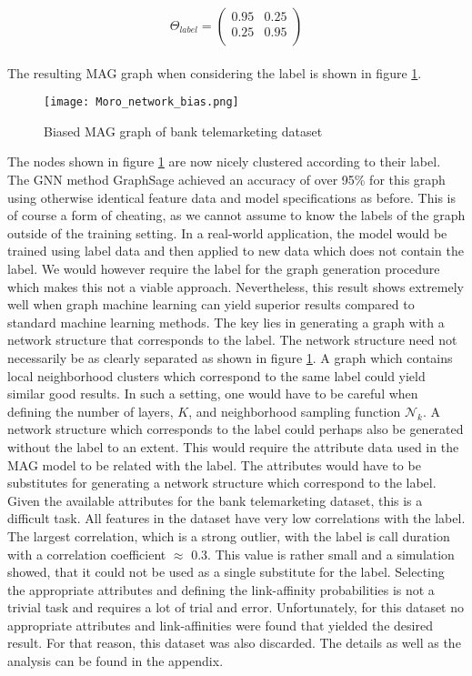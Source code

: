   \[ \Theta_{label} = 
	\begin{pmatrix}
        0.95 & 0.25 \\
		0.25 & 0.95 \\
	\end{pmatrix}
	\] \\
  
  \noindent The resulting MAG graph when considering the label is shown in figure
  \ref{fig:Moro_bias}.

  \begin{figure}[h]
		\centering
		\texttt{[image: Moro\_network\_bias.png]}
		\caption{Biased MAG graph of bank telemarketing dataset}
        \label{fig:Moro_bias}
  \end{figure}

  \noindent The nodes shown in figure \ref{fig:Moro_bias} are now nicely
  clustered according to their label. The GNN method GraphSage achieved an 
  accuracy of over 95\% for this graph using otherwise identical feature data
  and model specifications as before. This is of course a form of cheating, as 
  we cannot assume to know the labels of the graph outside of the training 
  setting. In a real-world application, the model would be trained using label
  data and then applied to new data which does not contain the label. We would
  however require the label for the graph generation procedure which makes this
  not a viable approach. Nevertheless, this result shows extremely well when
  graph machine learning can yield superior results compared to standard
  machine learning methods. The key lies in generating a graph with a network
  structure that corresponds to the label. The network structure need not
  necessarily be as clearly separated as shown in figure \ref{fig:Moro_bias}. A
  graph which contains local neighborhood clusters which correspond to the same
  label could yield similar good results. In such a setting, one would have to be
  careful when defining the number of layers, $K$, and neighborhood
  sampling function $\mathcal{N}_{k}$. A network structure which corresponds to
  the label could perhaps also be generated without the label to an extent. This 
  would require the attribute data used in the MAG model to be related with the
  label. The attributes would have to be substitutes for generating a network
  structure which correspond to the label. Given the available attributes for
  the bank telemarketing dataset, this is a difficult task. All features in the 
  dataset have very low correlations with the label. The largest correlation, 
  which is a strong outlier, with the label is call duration with a correlation 
  coefficient $\approx$ 0.3. This value is rather small and a simulation showed, 
  that it could not be used as a single substitute for the label. Selecting the
  appropriate attributes and defining the link-affinity probabilities is not a
  trivial task and requires a lot of trial and error. Unfortunately, for this
  dataset no appropriate attributes and link-affinities were found that yielded
  the desired result. For that reason, this dataset was also discarded. The
  details as well as the analysis can be found in the appendix. 

